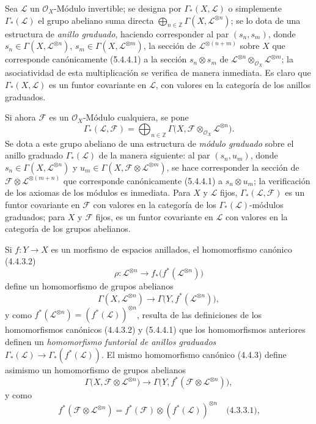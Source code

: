 \begin{env}[5.4.6]
\label{0.5.4.6-fr}
Sea $\mathcal{L}$ un $\mathcal{O}_X$-Módulo invertible; se designa por
$\Gamma_*(X,\mathcal{L})$ o simplemente $\Gamma_*(\mathcal{L})$ el grupo
abeliano suma directa
$\bigoplus_{n\in\mathbb{Z}}\Gamma(X,\mathcal{L}^{\otimes n})$; se lo dota
de una estructura de \emph{anillo graduado}, haciendo corresponder al par
$(s_n,s_m)$, donde $s_n\in\Gamma(X,\mathcal{L}^{\otimes n})$,
$s_m\in\Gamma(X,\mathcal{L}^{\otimes m})$, la sección de
$\mathcal{L}^{\otimes(n+m)}$ sobre $X$ que corresponde canónicamente
(5.4.4.1) a la sección $s_n\otimes s_m$ de
$\mathcal{L}^{\otimes n}\otimes_{\mathcal{O}_X}\mathcal{L}^{\otimes m}$;
la asociatividad de esta multiplicación se verifica de manera inmediata. Es
claro que $\Gamma_*(X,\mathcal{L})$ es un funtor covariante en
$\mathcal{L}$, con valores en la categoría de los anillos graduados.

Si ahora $\mathcal{F}$ es un $\mathcal{O}_X$-Módulo cualquiera, se pone
\[
  \Gamma_*(\mathcal{L},\mathcal{F})
  =\bigoplus_{n\in\mathbb{Z}}
   \Gamma\bigl(X,
     \mathcal{F}\otimes_{\mathcal{O}_X}\mathcal{L}^{\otimes n}\bigr).
\]
Se dota a este grupo abeliano de una estructura de \emph{módulo graduado} sobre
el anillo graduado $\Gamma_*(\mathcal{L})$ de la manera siguiente: al par
$(s_n,u_m)$, donde $s_n\in\Gamma(X,\mathcal{L}^{\otimes n})$ y
$u_m\in\Gamma(X,
\mathcal{F}\otimes\mathcal{L}^{\otimes m})$, se hace
corresponder la sección de
$\mathcal{F}\otimes\mathcal{L}^{\otimes(m+n)}$ que corresponde
canónicamente (5.4.4.1) a $s_n\otimes u_m$; la verificación de los axiomas de
los módulos es inmediata. Para $X$ y $\mathcal{L}$ fijos,
$\Gamma_*(\mathcal{L},\mathcal{F})$ es un funtor covariante en
$\mathcal{F}$ con valores en la categoría de los
$\Gamma_*(\mathcal{L})$-módulos graduados; para $X$ y $\mathcal{F}$ fijos,
es un funtor covariante en $\mathcal{L}$ con valores en la categoría de los
grupos abelianos.

Si $f:Y\to X$ es un morfismo de espacios anillados, el homomorfismo canónico
(4.4.3.2)
\[
  \rho:\mathcal{L}^{\otimes n}
  \longrightarrow
  f_*\bigl(f^*(\mathcal{L}^{\otimes n})\bigr)
\]
define un homomorfismo de grupos abelianos
\[
  \Gamma(X,\mathcal{L}^{\otimes n})
  \longrightarrow
  \Gamma\bigl(Y,f^*(\mathcal{L}^{\otimes n})\bigr),
\]
y como
$f^*(\mathcal{L}^{\otimes n})=(f^*(\mathcal{L}))^{\otimes n}$, resulta de las
definiciones de los homomorfismos canónicos (4.4.3.2) y (5.4.4.1) que los
homomorfismos anteriores definen un \emph{homomorfismo funtorial
de anillos graduados}
$\Gamma_*(\mathcal{L})\to\Gamma_*(f^*(\mathcal{L}))$. El mismo homomorfismo
canónico (4.4.3) define asimismo un homomorfismo de grupos abelianos
\[
  \Gamma\bigl(X,
    \mathcal{F}\otimes\mathcal{L}^{\otimes n}\bigr)
  \longrightarrow
  \Gamma\bigl(Y,
    f^*(\mathcal{F}\otimes\mathcal{L}^{\otimes n})\bigr),
\]
y como
\[
  f^*(\mathcal{F}\otimes\mathcal{L}^{\otimes n})
  =f^*(\mathcal{F})\otimes
   (f^*(\mathcal{L}))^{\otimes n}
  \quad\text{(4.3.3.1),}
\]


\end{env}
